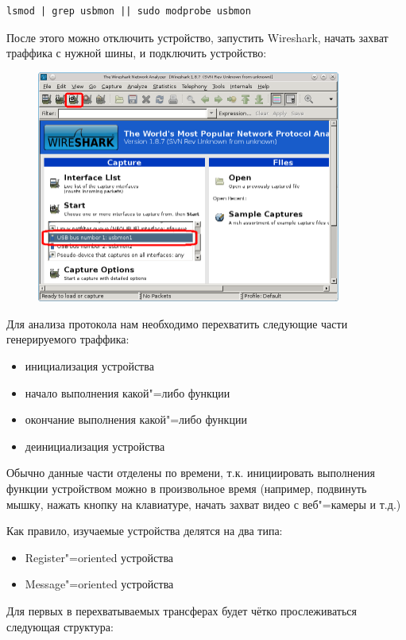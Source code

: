 \documentclass[10pt, a5paper]{article}
\begin{document}
\begin{verbatim}
lsmod | grep usbmon || sudo modprobe usbmon
\end{verbatim}
После этого можно отключить устройство, запустить Wireshark, начать захват траффика с нужной шины, и подключить устройство:

\begin{figure}[h!]
  \centering
  \includegraphics[width=10cm]{12_wireshark.png}
\end{figure}

Для анализа протокола нам необходимо перехватить следующие части генерируемого траффика:

\begin{itemize}
  \item инициализация устройства
  \item начало выполнения какой"=либо функции
  \item окончание выполнения какой"=либо функции
  \item деинициализация устройства
\end{itemize}

Обычно данные части отделены по времени, т.к. инициировать выполнения функции устройством можно в произвольное время (например, подвинуть мышку, нажать кнопку на клавиатуре, начать захват видео с веб"=камеры и т.д.)

Как правило, изучаемые устройства делятся на два типа:

\begin{itemize}
  \item Register"=oriented устройства
  \item Message"=oriented устройства
\end{itemize}

Для первых в перехватываемых трансферах будет чётко прослеживаться следующая структура:
\end{document}
